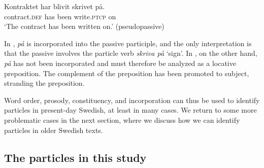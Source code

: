 \documentclass[output=paper]{langscibook}
\begin{document}
\ex\label{ex:lalu:14b}
\gll  Kontraktet     har   blivit   skrivet     på. \\
    contract\textsc{.def}   has   been   write.\textsc{ptcp}   on\\
\glt `The contract has been written on.’ (pseudopassive)\\
\z
\z


In , \textit{på} is incorporated into the passive participle, and the only interpretation is that the passive involves the particle verb \textit{skriva på} ‘sign’. In , on the other hand, \textit{på} has not been incorporated and must therefore be analyzed as a locative preposition. The complement of the preposition has been promoted to subject, stranding the preposition.



Word order, prosody, constituency, and incorporation can thus be used to identify particles in present-day Swedish, at least in many cases. We return to some more problematic cases in the next section, where we discuss how we can identify particles in older Swedish texts. 


\subsection{The particles in this study}\label{sec:lalu:2.3}
\end{document}
